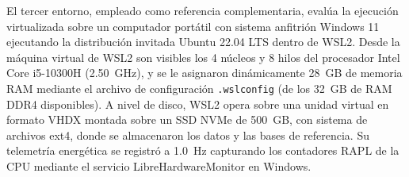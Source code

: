\documentclass[12pt,oneside,spanish]{book}
\begin{document}
    El tercer entorno, empleado como referencia complementaria, evalúa la ejecución virtualizada sobre un computador portátil con sistema anfitrión Windows 11 ejecutando la distribución invitada Ubuntu 22.04 LTS dentro de WSL2. Desde la máquina virtual de WSL2 son visibles los 4 núcleos y 8 hilos del procesador Intel Core i5-10300H (2.50~GHz), y se le asignaron dinámicamente 28~GB de memoria RAM mediante el archivo de configuración \texttt{.wslconfig} (de los 32~GB de RAM DDR4 disponibles). A nivel de disco, WSL2 opera sobre una unidad virtual en formato VHDX montada sobre un SSD NVMe de 500~GB, con sistema de archivos ext4, donde se almacenaron los datos y las bases de referencia. Su telemetría energética se registró a 1.0~Hz capturando los contadores RAPL de la CPU mediante el servicio LibreHardwareMonitor en Windows.
    
    \begin{table}[H]
    \centering
    \caption{Plataformas de cómputo utilizadas en la evaluación.}
    \label{tab:entornos}
    \footnotesize
    \setlength{\tabcolsep}{4pt}
    \end{table}
    
\end{document}
